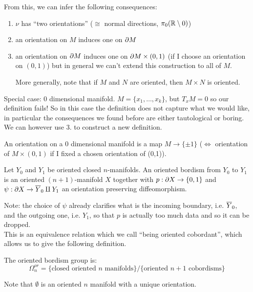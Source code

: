 \noindent From this, we can infer the following consequences:
\begin{enumerate}
    \item $\nu$ has ``two orientations'' ($\cong$ normal directions, $\pi_0(\mathbb{R}\setminus0)$)
    \item an orientation on $M$ induces one on $\partial M$
    \item an orientation on $\partial M$ induces one on $\partial M \times (0,1)$ (if I choose an orientation on $(0,1)$) but in general we can't extend this construction to all of $M$.

    \noindent More generally, note that if $M$ and $N$ are oriented, then $M\times N$ is oriented. \cite{FreedBordism}
\end{enumerate}

\noindent Special case: 0 dimensional manifold. $M = \{x_1, \dots, x_k\}$, but $T_x M = 0$ so our definition fails! So in this case the definition does not capture what we would like, in particular the consequences we found before are either tautological or boring. We can however use 3. to construct a new definition.
\begin{defn}
    An orientation on a 0 dimensional manifold is a map $M \to \{\pm 1\}$ ($\iff$ orientation of $M \times (0,1)$ if I fixed a chosen orientation of (0,1)).
\end{defn}

\begin{defn}
    Let  $Y_0$ and $Y_1$ be oriented closed $n$-manifolds.
    An oriented bordism from $Y_0$ to $Y_1$ is an oriented $(n+1)$-manifold $X$ together with $p: \partial X \to \{0,1\}$ and $\psi: \partial X \to \overline{Y}_0 \amalg Y_1$ an orientation preserving diffeomorphism.
\end{defn}
\noindent Note: the choice of $\psi$ already clarifies what is the incoming boundary, i.e. $\overline{Y}_0$, and the outgoing one, i.e. $Y_1$, so that $p$ is actually too much data and so it can be dropped.\\
This is an equivalence relation which we call ``being oriented cobordant'', which allows us to give the following definition.
\begin{defn}
    The oriented bordism group is:
    \begin{equation}
        \Omega_n^{or} = \{\text{closed oriented $n$ manifolds}\}/\{\text{oriented $n+1$ cobordisms}\}
    \end{equation}
\end{defn}
\begin{rem}
    Note that $\emptyset$ is an oriented $n$ manifold with a unique orientation.
\end{rem}

